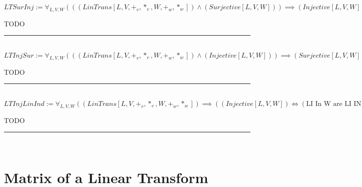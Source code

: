 \documentclass{book}
\newcommand{\abr}{:=}
\begin{document}
$LTSurInj \abr \forall_{L, V, W}(((LinTrans[L, V, +_v, *_v, W, +_w, *_w]) \land (Surjective[L, V, W])) \implies (Injective[L, V, W]))$
\begin{enumerate}
  \lit TODO
\end{enumerate} \vspace{.75mm} \hrule \vspace{.75mm} \ \\ 

$LTInjSur \abr \forall_{L, V, W}(((LinTrans[L, V, +_v, *_v, W, +_w, *_w]) \land (Injective[L, V, W])) \implies (Surjective[L, V, W]))$
\begin{enumerate}
  \lit TODO
\end{enumerate} \vspace{.75mm} \hrule \vspace{.75mm} \ \\ 

$LTInjLinInd \abr \forall_{L, V, W}((LinTrans[L, V, +_v, *_v, W, +_w, *_w]) \implies ((Injective[L, V, W]) \iff (\text{LI In W are LI IN V})))$
\begin{enumerate}
  \lit TODO
\end{enumerate} \vspace{.75mm} \hrule \vspace{.75mm} \ \\ 

\section{Matrix of a Linear Transform}





\end{document}
